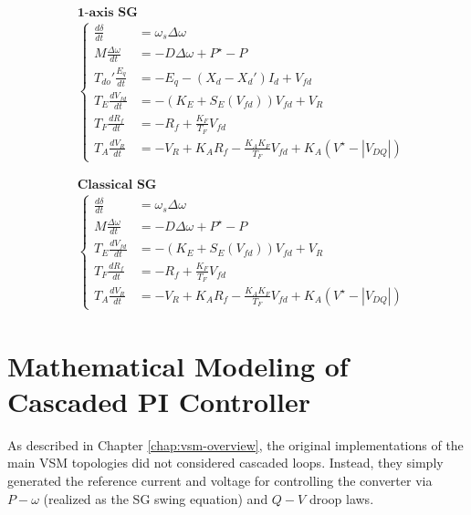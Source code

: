 \begin{equation*}
    \begin{aligned}
        &\textbf{1-axis SG}\\
        &\begin{cases}
            \frac{d\delta}{dt} &= \omega_s \Delta\omega\\
            M\frac{\Delta\omega}{dt} &= -D\Delta\omega + P^{\star} - P\\
            T_{do}' \frac{E_q}{dt} &= -E_q - (X_d - X_d')I_d + V_{fd}\\
            T_E \frac{dV_{fd}}{dt} &= -\left(K_E + S_E(V_{fd})\right)V_{fd} + V_R \\
            T_F \frac{dR_f}{dt} &= -R_f + \frac{K_F}{T_F}V_{fd} \\
            T_A \frac{dV_R}{dt} &= -V_R + K_A R_f - \frac{K_A K_F}{T_F}V_{fd} + K_A (V^{\star} - |V_{DQ}|)
        \end{cases}
    \end{aligned}
\end{equation*}

\begin{equation*}
    \begin{aligned}
        &\textbf{Classical SG}\\
        &\begin{cases}
            \frac{d\delta}{dt} &= \omega_s \Delta\omega\\
            M\frac{\Delta\omega}{dt} &= -D\Delta\omega + P^{\star} - P\\
            T_E \frac{dV_{fd}}{dt} &= -\left(K_E + S_E(V_{fd})\right)V_{fd} + V_R \\
            T_F \frac{dR_f}{dt} &= -R_f + \frac{K_F}{T_F}V_{fd} \\
            T_A \frac{dV_R}{dt} &= -V_R + K_A R_f - \frac{K_A K_F}{T_F}V_{fd} + K_A (V^{\star} - |V_{DQ}|)
        \end{cases}
    \end{aligned}
\end{equation*}

\section{Mathematical Modeling of Cascaded PI Controller}

As described in Chapter \ref{chap:vsm-overview}, the original implementations of
the main VSM topologies did not considered cascaded loops. Instead, they simply
generated the reference current and voltage for controlling the converter via
$P-\omega$ (realized as the SG swing equation) and $Q-V$ droop laws.

